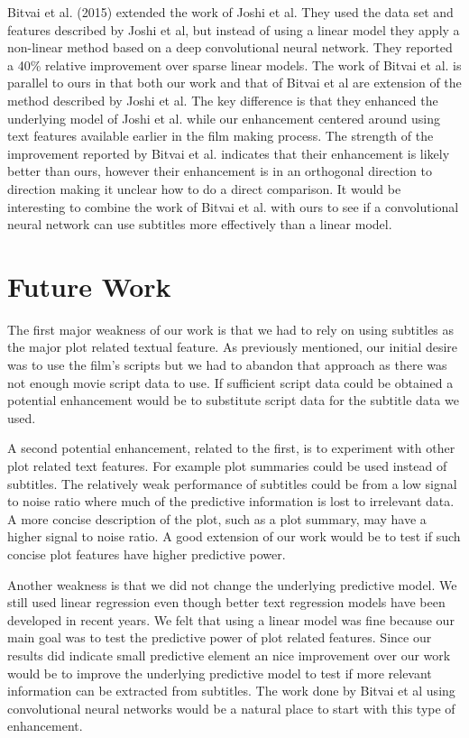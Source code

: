 \documentclass[11pt]{article}
\begin{document}
Bitvai et al. (2015) extended the work of Joshi et al. They used the data set and
features described by Joshi et al, but instead of using a linear model they apply
a non-linear method based on a deep convolutional neural network. They reported a 40\%
relative improvement over sparse linear models. The work of Bitvai et al. is parallel to
ours in that both our work and that of Bitvai et al are extension of the method described
by Joshi et al. The key difference is that they enhanced the underlying model of Joshi
et al. while our enhancement centered around using text features available earlier
in the film making process. The strength of the improvement reported by Bitvai et al. 
indicates that their enhancement is likely better than ours, however their enhancement is
in an orthogonal direction to direction making it unclear how to do a direct comparison.
It would be interesting to combine the work of Bitvai et al. with ours to see if a
convolutional neural network can use subtitles more effectively than a linear model.

\section{Future Work}
The first major weakness of our work is that we had to rely on using subtitles as the
major plot related textual feature. As previously mentioned, our initial desire was to
use the film's scripts but we had to abandon that approach as there was not enough
movie script data to use. If sufficient script data could be obtained a potential
enhancement would be to substitute script data for the subtitle data we used.

A second potential enhancement, related to the first, is to experiment with other
plot related text features. For example plot summaries could be used instead of subtitles.
The relatively weak performance of subtitles could be from a low signal to noise ratio
where much of the predictive information is lost to irrelevant data. A more concise
description of the plot, such as a plot summary, may have a higher signal to noise ratio.
A good extension of our work would be to test if such concise plot features have higher
predictive power.

Another weakness is that we did not change the underlying predictive model. We still
used linear regression even though better text regression models have been developed in
recent years. We felt that using a linear model was fine because our main goal was to
test the predictive power of plot related features. Since our results did indicate small
predictive element an nice improvement over our work would be to improve the underlying
predictive model to test if more relevant information can be extracted from subtitles.
The work done by Bitvai et al using convolutional neural networks would be a natural place
to start with this type of enhancement. 
\end{document}
